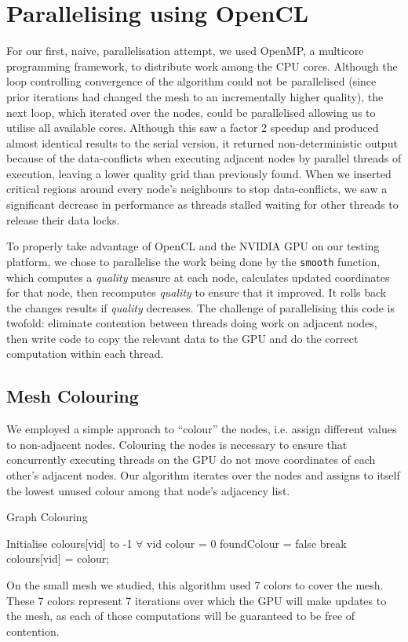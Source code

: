 \documentclass[a4paper,11pt, twocolumn]{article}
\begin{document}
\section{Parallelising using OpenCL}
For our first, naive, parallelisation attempt, we used OpenMP, a multicore programming framework, to distribute work among the CPU cores.
Although the loop controlling convergence of the algorithm could not be parallelised (since prior iterations had changed the mesh to an incrementally higher quality), the next loop, which iterated over the nodes, could be parallelised allowing us to utilise all available cores.
Although this saw a factor 2 speedup and produced almost identical results to the serial version, it returned non-deterministic output because of the data-conflicts when executing adjacent nodes by parallel threads of execution, leaving a lower quality grid than previously found.
When we inserted critical regions around every node's neighbours to stop data-conflicts, we saw a significant decrease in performance as threads stalled waiting for other threads to release their data locks.

To properly take advantage of OpenCL and the NVIDIA GPU on our testing platform, we chose to parallelise the work being done by the \verb+smooth+ function, which computes a \emph{quality} measure at each node, calculates updated coordinates for that node, then recomputes \emph{quality} to ensure that it improved.
It rolls back the changes results if \emph{quality} decreases.
The challenge of parallelising this code is twofold: eliminate contention between threads doing work on adjacent nodes, then write code to copy the relevant data to the GPU and do the correct computation within each thread.

\subsection{Mesh Colouring}
We employed a simple approach to ``colour'' the nodes, i.e. assign different values to non-adjacent nodes.
Colouring the nodes is necessary to ensure that concurrently executing threads on the GPU do not move coordinates of each other's adjacent nodes.
Our algorithm iterates over the nodes and assigns to itself the lowest unused colour among that node's adjacency list.
\begin{algorithm}[H]
\caption{Graph Colouring}
\label{al:colour}
\begin{algorithmic}[1]
\STATE Initialise colours[vid] to -1 $\forall$ vid
  \STATE colour = 0
      \STATE foundColour = false
      \STATE break
    \ENDIF
  \ENDFOR
  \STATE colours[vid] = colour;
\ENDFOR
\end{algorithmic}
\end{algorithm}
On the small mesh we studied, this algorithm used 7 colors to cover the mesh.  These 7 colors represent 7 iterations over which the GPU will make updates to the mesh, as each of those computations will be guaranteed to be free of contention.  
\end{document}

